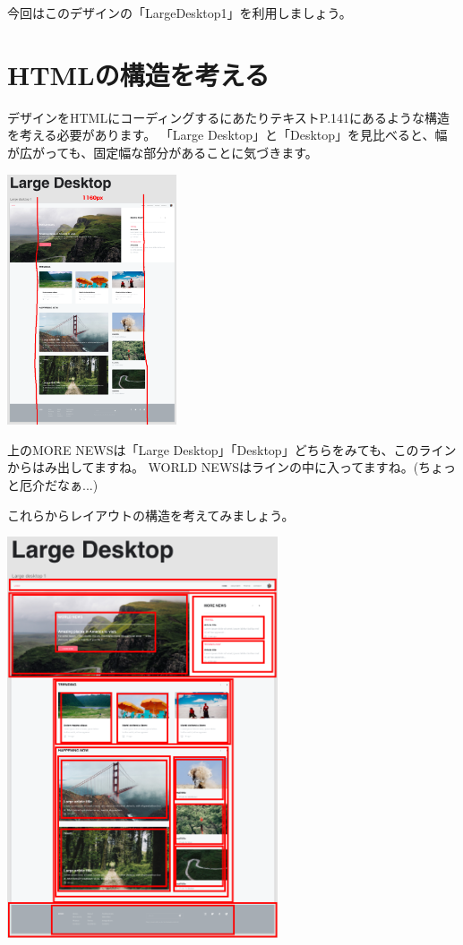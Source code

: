 \documentclass[mingoth,11pt,a4j,uplatex,dvipdfmx]{jsarticle}
\begin{document}
今回はこのデザインの「LargeDesktop1」を利用しましょう。




\section{HTMLの構造を考える}
デザインをHTMLにコーディングするにあたりテキストP.141にあるような構造を考える必要があります。
「Large Desktop」と「Desktop」を見比べると、幅が広がっても、固定幅な部分があることに気づきます。

\includegraphics[width=5cm]{img/LD-fixedwidth.png}

上のMORE NEWSは「Large Desktop」「Desktop」どちらをみても、このラインからはみ出してますね。
WORLD NEWSはラインの中に入ってますね。(ちょっと厄介だなぁ...)

これらからレイアウトの構造を考えてみましょう。
\vspace{1em}

\includegraphics[width=8cm]{img/LD-block.png}
\end{document}
